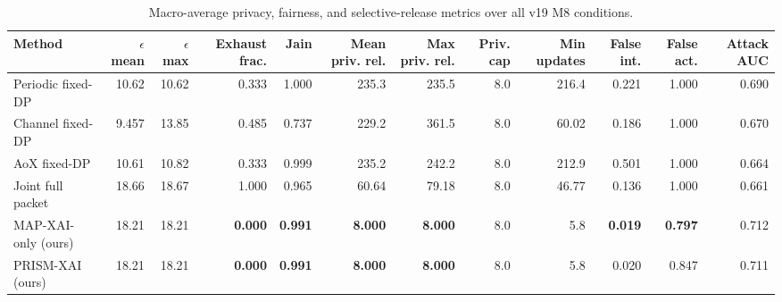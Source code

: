 

\begin{table}[t]
\centering
\caption{Macro-average privacy, fairness, and selective-release metrics over all v19 M8 conditions.}
\label{tab:macroprivacy}
\scriptsize
\setlength{\tabcolsep}{3pt}
\renewcommand{\arraystretch}{1.08}

\begin{adjustbox}{max width=\textwidth}
\begin{tabular}{lrrrrrrrrrrr}
\toprule
Method
& $\epsilon$ mean
& $\epsilon$ max
& Exhaust frac.
& Jain
& Mean priv. rel.
& Max priv. rel.
& Priv. cap
& Min updates
& False int.
& False act.
& Attack AUC \\
\midrule

Periodic fixed-DP
& 10.62
& 10.62
& 0.333
& 1.000
& 235.3
& 235.5
& 8.0
& 216.4
& 0.221
& 1.000
& 0.690 \\

Channel fixed-DP
& 9.457
& 13.85
& 0.485
& 0.737
& 229.2
& 361.5
& 8.0
& 60.02
& 0.186
& 1.000
& 0.670 \\

AoX fixed-DP
& 10.61
& 10.82
& 0.333
& 0.999
& 235.2
& 242.2
& 8.0
& 212.9
& 0.501
& 1.000
& 0.664 \\

Joint full packet
& 18.66
& 18.67
& 1.000
& 0.965
& 60.64
& 79.18
& 8.0
& 46.77
& 0.136
& 1.000
& 0.661 \\

\midrule

MAP-XAI-only (ours)
& 18.21
& 18.21
& \textbf{0.000}
& \textbf{0.991}
& \textbf{8.000}
& \textbf{8.000}
& 8.0
& 5.8
& \textbf{0.019}
& \textbf{0.797}
& 0.712 \\

PRISM-XAI (ours)
& 18.21
& 18.21
& \textbf{0.000}
& \textbf{0.991}
& \textbf{8.000}
& \textbf{8.000}
& 8.0
& 5.8
& 0.020
& 0.847
& 0.711 \\

\bottomrule
\end{tabular}
\end{adjustbox}
\end{table}
